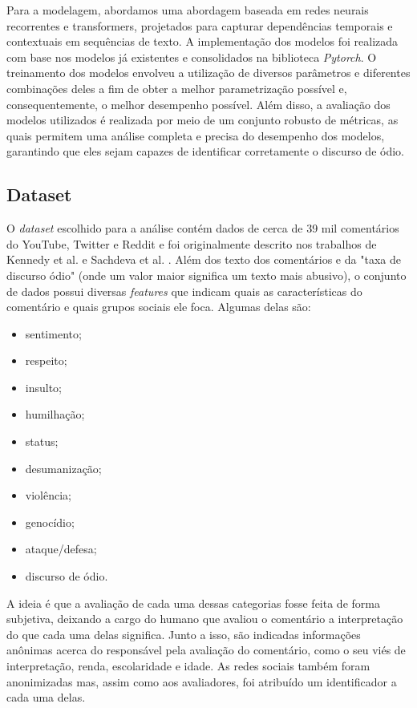 \documentclass[conference]{IEEEtran}
\begin{document}
Para a modelagem, abordamos uma abordagem baseada em redes neurais recorrentes e transformers, projetados para capturar dependências temporais e contextuais em sequências de texto. A implementação dos modelos foi realizada com base nos modelos já existentes e consolidados na biblioteca \textit{Pytorch}. O treinamento dos modelos envolveu a utilização de diversos parâmetros e diferentes combinações deles a fim de obter a melhor parametrização possível e, consequentemente, o melhor desempenho possível. Além disso, a avaliação dos modelos utilizados é realizada por meio de um conjunto robusto de métricas, as quais permitem uma análise completa e precisa do desempenho dos modelos, garantindo que eles sejam capazes de identificar corretamente o discurso de ódio.

\subsection{Dataset}

O \textit{dataset} escolhido para a análise contém dados de cerca de 39 mil comentários do YouTube, Twitter e Reddit e foi originalmente descrito nos trabalhos de Kennedy et al. \cite{kennedy2020constructing} e Sachdeva et al. \cite{sachdeva-etal-2022-measuring}. Além dos texto dos comentários e da "taxa de discurso ódio" (onde um valor maior significa um texto mais abusivo), o conjunto de dados possui diversas \textit{features} que indicam quais as características do comentário e quais grupos sociais ele foca. Algumas delas são:

\begin{itemize}
    \item sentimento;
    \item respeito;
    \item insulto;
    \item humilhação;
    \item status;
    \item desumanização;
    \item violência;
    \item genocídio;
    \item ataque/defesa;
    \item discurso de ódio.
\end{itemize}


A ideia é que a avaliação de cada uma dessas categorias fosse feita de forma subjetiva, deixando a cargo do humano que avaliou o comentário a interpretação do que cada uma delas significa. Junto a isso, são indicadas informações anônimas acerca do responsável pela avaliação do comentário, como o seu viés de interpretação, renda, escolaridade e idade. As redes sociais também foram anonimizadas mas, assim como aos avaliadores, foi atribuído um identificador a cada uma delas.
\end{document}
